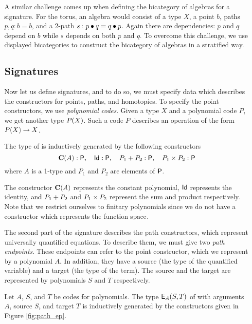 A similar challenge comes up when defining the bicategory of algebras for a signature.
For the torus, an algebra would consist of a type $X$, a point $b$, paths $p, q : b = b$, and a 2-path $s : p \bullet q = q \bullet p$.
Again there are dependencies: $p$ and $q$ depend on $b$ while $s$ depends on both $p$ and $q$.
To overcome this challenge, we use displayed bicategories to construct the bicategory of algebras in a stratified way.

\subsection{Signatures}
Now let us define signatures, and to do so, we must specify data which describes the constructors for points, paths, and homotopies.
To specify the point constructors, we use \emph{polynomial codes}.
Given a type $X$ and a polynomial code $P$, we get another type $P(X)$.
Such a code $P$ describes an operation of the form $P(X) \rightarrow X$.

\begin{definition}
The type of  is inductively generated by the following constructors
\[ 
\operatorname{\mathbf{C}}(A) : \mathsf{P}, \quad \mathsf{Id} : \mathsf{P}, \quad P_1 + P_2 : \mathsf{P}, \quad P_1 \times P_2 : \mathsf{P}
\]
where $A$ is a 1-type and $P_1$ and $P_2$ are elements of $\mathsf{P}$.
\end{definition}

The constructor $\operatorname{\mathbf{C}}(A)$ represents the constant polynomial, $\mathsf{Id}$ represents the identity,
and $P_1 + P_2$ and $P_1 \times P_2$ represent the sum and product respectively.
Note that we restrict ourselves to finitary polynomials since we do not have a constructor which represents the function space.

The second part of the signature describes the path constructors, which represent universally quantified equations.
To describe them, we must give two \emph{path endpoints}.
These endpoints can refer to the point constructor, which we represent by a polynomial $A$.
In addition, they have a source (the type of the quantified variable) and a target (the type of the term).
The source and the target are represented by polynomials $S$ and $T$ respectively.

\begin{definition}
Let $A$, $S$, and $T$ be codes for polynomials.
The type $\mathsf{E}_{A}(S,T)$ of  with arguments $A$, source  $S$, and target $T$ is inductively generated by the constructors given in Figure \ref{fig:path_ep}.
\end{definition}

